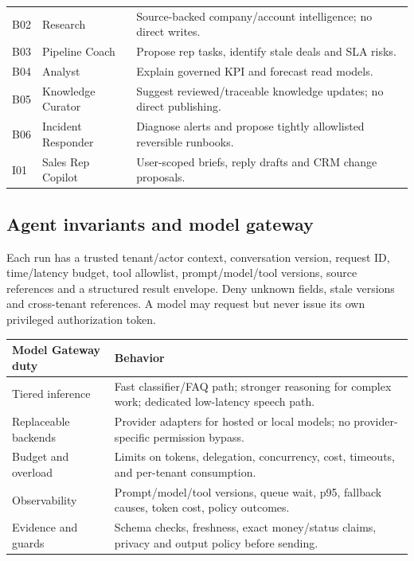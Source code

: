 \documentclass[10.5pt,a4paper,oneside]{article}
\begin{document}
\begin{longtable}{@{}L{13mm}L{47mm}L{95mm}@{}}
B02 & Research & Source-backed company/account intelligence; no direct writes.\\
B03 & Pipeline Coach & Propose rep tasks, identify stale deals and SLA risks.\\
B04 & Analyst & Explain governed KPI and forecast read models.\\
B05 & Knowledge Curator & Suggest reviewed/traceable knowledge updates; no direct publishing.\\
B06 & Incident Responder & Diagnose alerts and propose tightly allowlisted reversible runbooks.\\
I01 & Sales Rep Copilot & User-scoped briefs, reply drafts and CRM change proposals.\\
\bottomrule
\end{longtable}\normalsize
\subsection{Agent invariants and model gateway}
Each run has a trusted tenant/actor context, conversation version, request ID, time/latency budget, tool allowlist, prompt/model/tool versions, source references and a structured result envelope. Deny unknown fields, stale versions and cross-tenant references. A model may request but never issue its own privileged authorization token.
\begin{tabularx}{\textwidth}{@{}L{39mm}Y@{}}
\toprule{}\textbf{Model Gateway duty} & \textbf{Behavior}\\\midrule
Tiered inference & Fast classifier/FAQ path; stronger reasoning for complex work; dedicated low-latency speech path.\\
Replaceable backends & Provider adapters for hosted or local models; no provider-specific permission bypass.\\
Budget and overload & Limits on tokens, delegation, concurrency, cost, timeouts, and per-tenant consumption.\\
Observability & Prompt/model/tool versions, queue wait, p95, fallback causes, token cost, policy outcomes.\\
Evidence and guards & Schema checks, freshness, exact money/status claims, privacy and output policy before sending.\\
\bottomrule
\end{tabularx}
\end{document}
